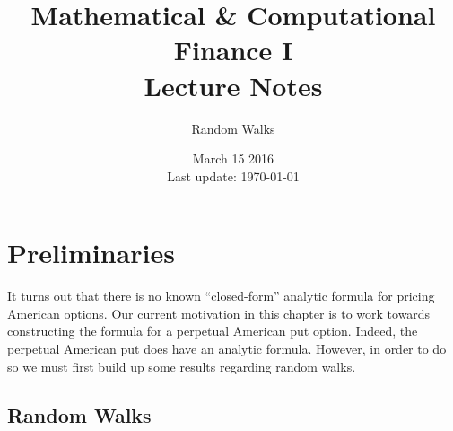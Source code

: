 \documentclass[12pt]{article}
\newlength\tindent
\renewcommand{\indent}{\hspace*{\tindent}}
\begin{document}
 
 
\title{Mathematical \& Computational Finance I\\Lecture Notes}
\author{Random Walks}
\date{March 15 2016 \\ Last update: \today{}}
\maketitle

\section{Preliminaries}

\indent It turns out that there is no known ``closed-form'' analytic formula for pricing American options. Our current motivation in this chapter is to work towards constructing the formula for a perpetual American put option. Indeed, the perpetual American put does have an analytic formula. However, in order to do so we must first build up some results regarding random walks.

\subsection{Random Walks}
\end{document}
